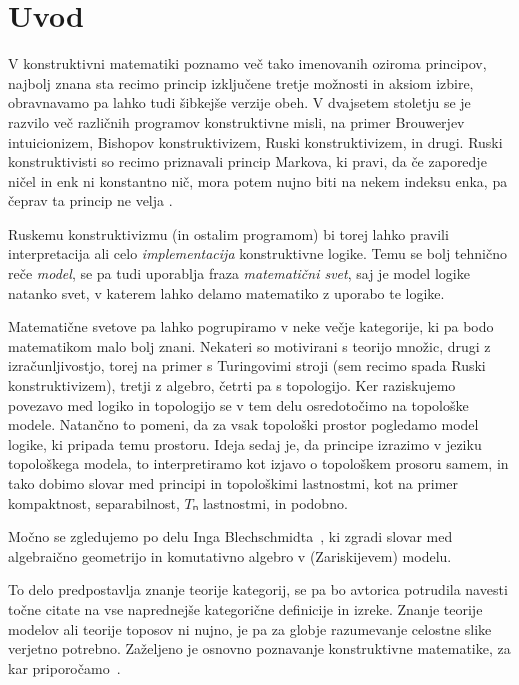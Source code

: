 \section{Uvod}

V konstruktivni matematiki poznamo več tako imenovanih 
oziroma  principov, najbolj znana sta recimo princip izključene
tretje možnosti in aksiom izbire, obravnavamo pa lahko tudi šibkejše verzije
obeh. V dvajsetem stoletju se je razvilo več različnih programov konstruktivne
misli, na primer Brouwerjev intuicionizem, Bishopov konstruktivizem, Ruski
konstruktivizem, in drugi. Ruski konstruktivisti so recimo priznavali princip
Markova, ki pravi, da če zaporedje ničel in enk ni konstantno nič, mora potem
nujno biti na nekem indeksu enka, pa čeprav ta princip ne velja
.

Ruskemu konstruktivizmu (in ostalim programom) bi torej lahko pravili
interpretacija ali celo \emph{implementacija} konstruktivne logike. Temu se bolj
tehnično reče \emph{model}, se pa tudi uporablja fraza \emph{matematični svet},
saj je model logike natanko svet, v katerem lahko delamo matematiko z uporabo te
logike.

Matematične svetove pa lahko pogrupiramo v neke večje kategorije, ki pa bodo
matematikom malo bolj znani. Nekateri so motivirani s teorijo množic, drugi z
izračunljivostjo, torej na primer s Turingovimi stroji (sem recimo spada Ruski
konstruktivizem), tretji z algebro, četrti pa s topologijo. Ker raziskujemo
povezavo med logiko in topologijo se v tem delu osredotočimo na topološke
modele. Natančno to pomeni, da za vsak topološki prostor pogledamo model logike,
ki pripada temu prostoru. Ideja sedaj je, da  principe izrazimo v
jeziku topološkega modela, to interpretiramo kot izjavo o topološkem prosoru
samem, in tako dobimo slovar med  principi in topološkimi
lastnostmi, kot na primer kompaktnost, separabilnost, \(Tₙ\) lastnostmi, in
podobno.

Močno se zgledujemo po delu Inga Blechschmidta~\cite{Blechschmidt17,
  Blechschmidt18, Blechschmidt20, Blechschmidt22}, ki zgradi slovar med
algebraično geometrijo in komutativno algebro v (Zariskijevem) modelu.

To delo predpostavlja znanje teorije kategorij, se pa bo avtorica potrudila
navesti točne citate na vse naprednejše kategorične definicije in izreke. Znanje
teorije modelov ali teorije toposov ni nujno, je pa za globje razumevanje
celostne slike verjetno potrebno. Zaželjeno je osnovno poznavanje konstruktivne
matematike, za kar priporočamo~\cite{Bauer16, Greenleaf20, Bishop85}.

